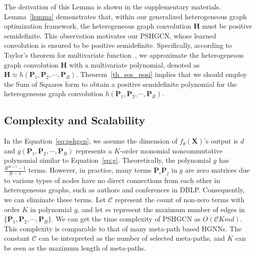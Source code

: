 \documentclass{article}
\begin{document}
The derivation of this Lemma is shown in the supplementary materials. Lemma~\ref{lemma} demonstrates that, within our generalized heterogeneous graph optimization framework, the heterogeneous graph convolution $\mathbf{H}$ must be positive semidefinite. This observation motivates our PSHGCN, whose learned convolution is ensured to be positive semidefinite. Specifically, according to Taylor's theorem for multivariate function~\cite{taylor_mul_fun}, we approximate the heterogeneous graph convolution $\mathbf{H}$ with a multivariate polynomial, denoted as $\mathbf{H} \approx h(\mathbf{P}_1,\mathbf{P}_2,\cdots,\mathbf{P}_R)$. Theorem~\ref{th_sos_posi} implies that we should employ the Sum of Squares form to obtain a positive semidefinite polynomial for the heterogeneous graph convolution $h(\mathbf{P}_1,\mathbf{P}_2,\cdots,\mathbf{P}_R)$.




\subsection{Complexity and Scalability}\label{se:scale}
In the Equation~\eqref{eq:pshgcn}, we assume the 
dimension of $f_\theta(\mathbf{X})$'s output is $d$ and $g(\mathbf{P}_1,\mathbf{P}_2,\cdots,\mathbf{P}_R)$ represents a $K$-order monomial noncommutative polynomial similar to Equation~\eqref{eq:g}. Theoretically, the polynomial $g$ has $\frac{R^{K+1}-1}{R-1}$ terms. However, in practice, many terms $\mathbf{P}_i\mathbf{P}_j$ in $g$ are zero matrices due to various types of nodes have no direct connections from each other in heterogeneous graphs, such as authors and conferences in DBLP.
Consequently, we can eliminate these terms. Let $\mathcal{C}$ represent the count of non-zero terms with order $K$ in polynomial $g$, and let $m$ represent the maximum number of edges in $\{\mathbf{P}_1,\mathbf{P}_2,\cdots,\mathbf{P}_R\}$. We can get the time complexity of PSHGCN as $O(\mathcal{C}Kmd)$. This complexity is comparable to that of many meta-path based HGNNs. The constant $\mathcal{C}$ can be interpreted as the number of selected meta-paths, and $K$ can be seen as the maximum length of meta-paths.
\end{document}
